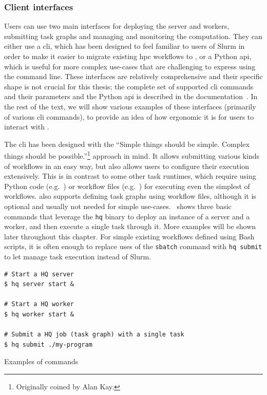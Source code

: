 \subsubsection*{Client interfaces}
Users can use two main interfaces for deploying the \hyperqueue{} server and workers,
submitting task graphs and managing and monitoring the computation. They can either use a
\gls{cli}, which has been designed to feel familiar to users of Slurm in order to
make it easier to migrate existing \gls{hpc} workflows to \hyperqueue{}, or
a Python \gls{api}, which is useful for more complex use-cases that are challenging
to express using the command line. These interfaces are relatively comprehensive and their specific
shape is not crucial for this thesis; the complete set of supported \gls{cli}
commands and their parameters and the Python \gls{api} is described in the
\hyperqueue{} documentation~\cite{hq_docs}. In the rest of the text, we will
show various examples of these interfaces (primarily of various \gls{cli} commands),
to provide an idea of how ergonomic it is for users to interact with \hyperqueue{}.

The \gls{cli} has been designed with the ``Simple things should be simple. Complex
things should be possible.''\footnote{Originally coined by Alan Kay.} approach in mind. It allows submitting various
kinds of workflows in an easy way, but also allows users to configure their execution extensively.
This is in contrast to some other task runtimes, which require using Python code (e.g.\
\dask{}) or workflow files (e.g.\ \snakemake{}) for executing even the
simplest of workflows. \hyperqueue{} also supports defining task graphs using workflow
files, although it is optional and usually not needed for simple use-cases.~
shows three basic commands that leverage the \texttt{hq} binary to deploy an instance
of a \hyperqueue{} server and a worker, and then execute a single task through it. More
examples will be shown later throughout this chapter. For simple existing workflows defined using
Bash scripts, it is often enough to replace uses of the \texttt{sbatch} command with
\texttt{hq submit} to let \hyperqueue{} manage task execution instead of Slurm.

\begin{listing}[h]
	\begin{verbatim}
# Start a HQ server
$ hq server start &

# Start a HQ worker
$ hq worker start &

# Submit a HQ job (task graph) with a single task
$ hq submit ./my-program
	\end{verbatim}
	\caption{Examples of \hyperqueue{}  commands}
	\label{lst:hq-cli-commands}
\end{listing}

